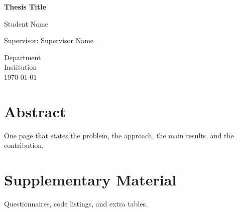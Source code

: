 \documentclass[12pt,a4paper,oneside]{report}
\begin{document}
\begin{titlepage}
  \centering
  \vspace*{3cm}
  {\LARGE\bfseries Thesis Title\par}
  \vspace{1.5cm}
  {\large Student Name\par}
  \vspace{0.5cm}
  {\large Supervisor: Supervisor Name\par}
  \vfill
  {\large Department\\Institution\\\today\par}
\end{titlepage}

\chapter*{Abstract}
One page that states the problem, the approach, the main results, and the contribution.

\tableofcontents











\appendix
\chapter{Supplementary Material}
Questionnaires, code listings, and extra tables.
\end{document}

